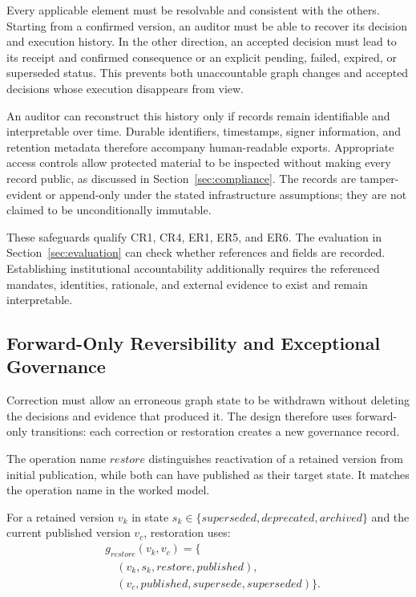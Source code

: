 \documentclass[journal]{IEEEtran}
\begin{document}
Every applicable element must be resolvable and consistent
with the others. Starting from a confirmed version, an
auditor must be able to recover its decision and execution
history. In the other direction, an accepted decision must
lead to its receipt and confirmed consequence or an explicit
pending, failed, expired, or superseded status. This prevents
both unaccountable graph changes and accepted decisions
whose execution disappears from view.

An auditor can reconstruct this history only if records remain
identifiable and interpretable over time. Durable identifiers,
timestamps, signer information, and retention metadata therefore
accompany human-readable exports. Appropriate access controls allow
protected material to be inspected without making every record public,
as discussed in Section~\ref{sec:compliance}. The records are
tamper-evident or append-only under the stated infrastructure assumptions;
they are not claimed to be unconditionally immutable.

These safeguards qualify CR1, CR4, ER1, ER5, and ER6.
The evaluation in Section~\ref{sec:evaluation} can check
whether references and fields are recorded. Establishing
institutional accountability additionally requires the
referenced mandates, identities, rationale, and external
evidence to exist and remain interpretable.

\subsection{Forward-Only Reversibility and Exceptional Governance}
\label{sec:reversibility}

Correction must allow an erroneous graph state to be withdrawn
without deleting the decisions and evidence that produced it.
The design therefore uses forward-only transitions: each
correction or restoration creates a new governance record.

The operation name $\mathit{restore}$ distinguishes reactivation
of a retained version from initial publication, while both can
have published as their target state. It matches the operation
name in the worked model.

For a retained version $v_k$ in state
$s_k\in\{\mathit{superseded},\mathit{deprecated},\mathit{archived}\}$
and the current published version $v_c$, restoration uses:
\begin{equation}
\label{eq:restoration_plan}
\begin{aligned}
&g_{restore}(v_k,v_c)=\{\\[-1mm]
&\quad(v_k,s_k,\mathit{restore},\mathit{published}),\\
&\quad(v_c,\mathit{published},\mathit{supersede},
\mathit{superseded})\}.
\end{aligned}
\end{equation}
\end{document}
